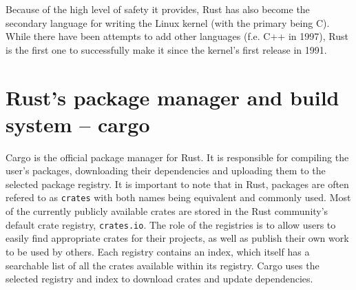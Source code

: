 \documentclass[licencjacka,en]{pracamgr}
\begin{document}
Because of the high level of safety it provides, Rust has also become the secondary
language for writing the Linux kernel (with the primary being C). While there have been
attempts to add other languages (f.e. C++ in 1997), Rust is the first one to successfully
make it since the kernel's first release in 1991.

\section{Rust's package manager and build system -- cargo}\label{r:section_cargo}

Cargo is the official package manager for Rust. It is responsible for compiling the user's
packages, downloading their dependencies and uploading them to the selected package registry.
It is important to note that in Rust, packages are often refered to as \texttt{crates} with both
names being equivalent and commonly used. Most of the currently publicly available crates are
stored in the Rust community's default crate registry, \texttt{crates.io}. The role of the
registries is to allow users to easily find appropriate crates for their projects, as well as
publish their own work to be used by others. Each registry contains an index, which itself has
a searchable list of all the crates available within its registry. Cargo uses the selected registry
and index to download crates and update dependencies.
\end{document}
